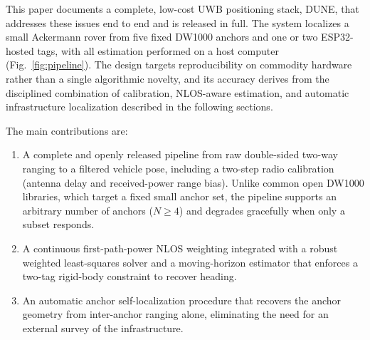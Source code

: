 This paper documents a complete, low-cost UWB positioning stack, DUNE,
that addresses these issues end to end and is released in full. The
system localizes a small Ackermann rover from five fixed DW1000 anchors
and one or two ESP32-hosted tags, with all estimation performed on a
host computer (Fig.~\ref{fig:pipeline}). The design targets
reproducibility on commodity hardware rather than a single algorithmic
novelty, and its accuracy derives from the disciplined combination of
calibration, NLOS-aware estimation, and automatic infrastructure
localization described in the following sections.

The main contributions are:
\begin{enumerate}
  \item A complete and openly released pipeline from raw double-sided
  two-way ranging to a filtered vehicle pose, including a two-step radio
  calibration (antenna delay and received-power range bias). Unlike
  common open DW1000 libraries, which target a fixed small anchor set,
  the pipeline supports an arbitrary number of anchors ($N\!\ge\!4$) and
  degrades gracefully when only a subset responds.
  \item A continuous first-path-power NLOS weighting integrated with a
  robust weighted least-squares solver and a moving-horizon estimator
  that enforces a two-tag rigid-body constraint to recover heading.
  \item An automatic anchor self-localization procedure that recovers
  the anchor geometry from inter-anchor ranging alone, eliminating the
  need for an external survey of the infrastructure.
\end{enumerate}
